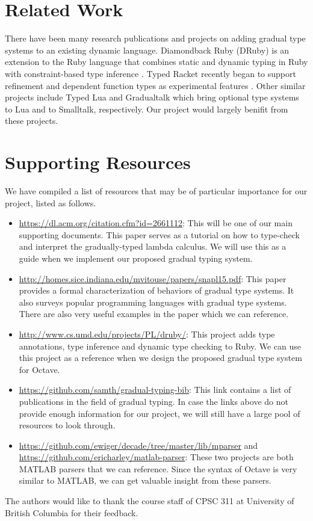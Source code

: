 \section{Related Work}
There have been many research publications and projects on adding gradual type
systems to an existing dynamic language. Diamondback Ruby (DRuby) is an
extension to the Ruby language that combines static and dynamic typing in Ruby
with constraint-based type inference \cite{furr2009combining}. Typed Racket
\cite{tobin2006interlanguage} recently began to support refinement and dependent
function types as experimental features \cite{racket2017refinement}. Other
similar projects include Typed Lua \cite{maidl2014typed} and Gradualtalk
\cite{allende2014gradual} which bring optional type systems to Lua and to
Smalltalk, respectively. Our project would largely benifit from these projects.

\section{Supporting Resources}
\label{sec-supporting-resources}
We have compiled a list of resources that may be of particular importance for
our project, listed as follows.

\begin{itemize}
    \item \url{https://dl.acm.org/citation.cfm?id=2661112}: This will be one of
        our main supporting documents. This paper serves as a tutorial on how to
        type-check and interpret the gradually-typed lambda calculus. We will
        use this as a guide when we implement our proposed gradual typing
        system.
    \item \url{http://homes.sice.indiana.edu/mvitouse/papers/snapl15.pdf}: This
        paper provides a formal characterization of behaviors of gradual type
        systems. It also surveys popular programming languages with gradual type
        systems. There are also very useful examples in the paper which we can
        reference.
    \item \url{http://www.cs.umd.edu/projects/PL/druby/}: This project adds type
        annotations, type inference and dynamic type checking to Ruby. We can
        use this project as a reference when we design the proposed gradual type
        system for Octave.
    \item \url{https://github.com/samth/gradual-typing-bib}: This link contains
        a list of publications in the field of gradual typing. In case the links
        above do not provide enough information for our project, we will still
        have a large pool of resources to look through.
    \item \url{https://github.com/ewiger/decade/tree/master/lib/mparser} and
        \url{https://github.com/ericharley/matlab-parser}: These two projects
        are both MATLAB parsers that we can reference. Since the syntax of
        Octave is very similar to MATLAB, we can get valuable insight from these
        parsers.
\end{itemize}

\appendix

\begin{acks}
    The authors would like to thank the course staff of CPSC 311 at University
    of British Columbia for their feedback.
\end{acks}
